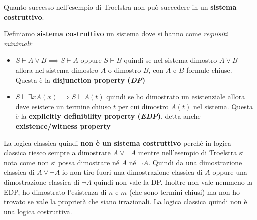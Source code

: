 \documentclass[a4paper,12pt, oneside]{book}
\begin{document}
Quanto successo nell'esempio di Troelstra non può succedere in un
\textbf{sistema costruttivo}.
\begin{definizione}
  Definiamo \textbf{sistema costruttivo} un sistema dove si hanno come
  \textit{requisiti minimali}: 
\begin{itemize}
  \item $S\vdash A\lor B\implies S\vdash A\mbox{ oppure } S\vdash B$ quindi se
  nel sistema dimostro $A\lor B$ allora nel sistema dimostro $A$ o dimostro $B$,
  con $A$ e $B$ formule chiuse. Questa è la \textbf{disjunction property
    (\textit{DP})}  
  \item $S\vdash\exists xA(x)\implies S\vdash A(t)$ quindi se ho dimostrato un
  esistenziale allora deve esistere un termine chiuso $t$ per cui dimostro
  $A(t)$ nel sistema. Questa è la \textbf{explicitly definibility property
    (\textit{EDP})}, detta anche \textbf{existence/witness property}
\end{itemize}
\end{definizione}
La logica classica quindi \textbf{non è un sistema costruttivo} perché in logica
classica riesco sempre a dimostrare $A\lor\neg A$ mentre nell'esempio di
Troelstra si nota come non si possa dimostrare né $A$ né $\neg A$. Quindi da una
dimostrazione classica di $A\lor\neg A$ io non tiro fuori una dimostrazione
classica di $A$ oppure una dimostrazione classica di $\neg A$ quindi non vale la
DP. Inoltre non vale nemmeno la EDP, ho dimostrato l'esistenza di $n$ e $m$ (che
sono termini chiusi) ma non ho trovato se vale la proprietà che siano
irrazionali. La logica classica quindi non è una logica costruttiva.\\
\end{document}
